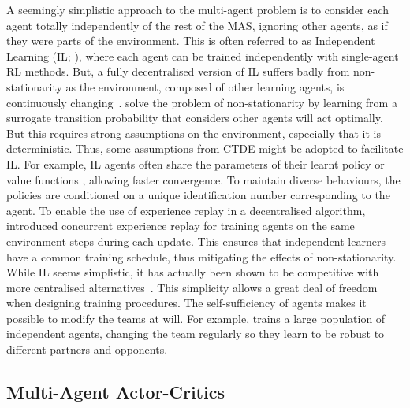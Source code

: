 A seemingly simplistic approach to the multi-agent problem is to consider each agent totally independently of the rest of the MAS, ignoring other agents, as if they were parts of the environment. This is often referred to as Independent Learning (IL; \cite{Tan1993, Claus1998_CoopMARL, Tampuu2017_IDQN}), where each agent can be trained independently with single-agent RL methods. 
But, a fully decentralised version of IL suffers badly from non-stationarity as the environment, composed of other learning agents, is continuously changing~\citep{Tan1993, Foerster2016_SolveRiddles}. 
\cite{Jiang2022_I2Q} solve the problem of non-stationarity by learning from a surrogate transition probability that considers other agents will act optimally. But this requires strong assumptions on the environment, especially that it is deterministic.
Thus, some assumptions from CTDE might be adopted to facilitate IL. For example, IL agents often share the parameters of their learnt policy or value functions \citep{Tan1993, Foerster2016_SolveRiddles, Gupta2017_PSTRPO, SchroederDeWitt2020_IPPO}, allowing faster convergence. To maintain diverse behaviours, the policies are conditioned on a unique identification number corresponding to the agent. To enable the use of experience replay in a decentralised algorithm, \cite{Omidshafiei2017_DecentrMultiTask} introduced concurrent experience replay for training agents on the same environment steps during each update. This ensures that independent learners have a common training schedule, thus mitigating the effects of non-stationarity. 
While IL seems simplistic, it has actually been shown to be competitive with more centralised alternatives~\citep{SchroederDeWitt2020_IPPO, Lyu2021_DecentralisedCritic, Jiang2024_DecentralizedMARL}.
This simplicity allows a great deal of freedom when designing training procedures. The self-sufficiency of agents makes it possible to modify the teams at will. For example, \citet{Jaderberg2018_FTW} trains a large population of independent agents, changing the team regularly so they learn to be robust to different partners and opponents. 


\subsection{Multi-Agent Actor-Critics}\label{sec:MADRL:CentralCritic}

